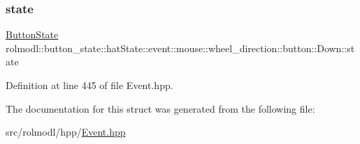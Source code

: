 \subsubsection{\texorpdfstring{state}{state}}
{\footnotesize\ttfamily \mbox{\hyperlink{namespacerolmodl_ad08ec5c56aa1db118f871357b2d475fd}{Button\+State}} rolmodl\+::button\+\_\+state\+::hat\+State\+::event\+::mouse\+::wheel\+\_\+direction\+::button\+::\+Down\+::state}



Definition at line 445 of file Event.\+hpp.



The documentation for this struct was generated from the following file\+:\begin{DoxyCompactItemize}
\item 
src/rolmodl/hpp/\mbox{\hyperlink{_event_8hpp}{Event.\+hpp}}\end{DoxyCompactItemize}
